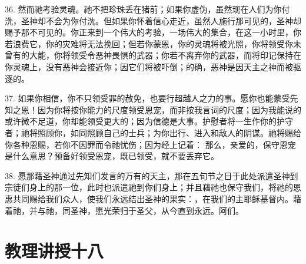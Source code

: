 36. 然而祂考验灵魂。祂不把珍珠丢在猪前；如果你虚伪，虽然现在人们为你付洗，圣神却不会为你付洗。但如果你怀着信心走近，虽然人施行那可见的，圣神却赐予那不可见的。你正来到一个伟大的考验，一场伟大的集合，在这一小时里，你若浪费它，你的灾难将无法挽回；但若你蒙恩，你的灵魂将被光照，你将领受你未曾有的大能，你将领受令恶神畏惧的武器；你若不离弃你的武器，而将印记保持在你灵魂上，没有恶神会接近你；因它们将被吓倒；的确，恶神是因天主之神而被驱逐的。\par

37. 如果你相信，你不只领受罪的赦免，也要行超越人之力的事。愿你也能蒙受先知之恩！因为你将按你能力的尺度领受恩宠，而非按我言词的尺度；因为我能说的或许微不足道，你却能领受更大的；因为信德是大事。护慰者将一生作你的护守者；祂将照顾你，如同照顾自己的士兵；为你出行、进入和敌人的阴谋。祂将赐给你各种恩赐，若你不因罪而令祂忧伤；因为经上记着： 那么，亲爱的，保守恩宠是什么意思？预备好领受恩宠，既已领受，就不要丢弃它。\par

38. 愿那藉圣神通过先知们发言的万有的天主，那在五旬节之日于此处派遣圣神到宗徒们身上的那一位，此时也派遣祂到你们身上；并且藉祂也保守我们，将祂的恩惠共同赐给我们众人，使我们永远结出圣神的果实：，在我们的主耶稣基督内。藉着祂，并与祂，同圣神，愿光荣归于圣父，从今直到永远。阿们。\par



\section{教理讲授十八}

\par

\par

\par

